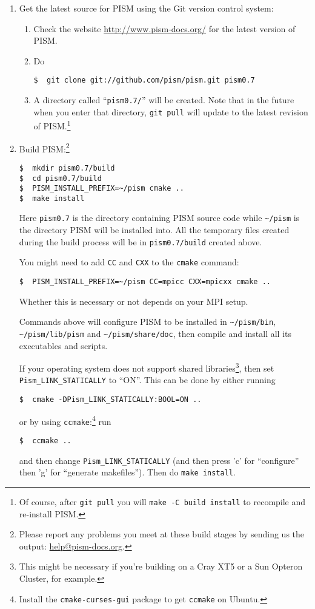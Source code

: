 \documentclass[titlepage,letterpaper,final]{scrartcl}
\begin{document}
\begin{enumerate}
\item Get the latest source for PISM using the Git version control system:
\begin{enumerate}
\item \label{getPISMstep} Check the website \url{http://www.pism-docs.org/} for the latest version of PISM.
\item Do
\begin{verbatim}
$  git clone git://github.com/pism/pism.git pism0.7
\end{verbatim}
\item A directory called ``\texttt{pism0.7/}'' will be created.  Note that in the future when you enter that directory,
  \texttt{git pull} will update to the latest revision of PISM.\footnote{Of course, after \texttt{git pull} you will \texttt{make -C build install} to recompile and re-install PISM.}
\end{enumerate}
\item Build PISM:\footnote{Please report any problems you meet at these build stages by sending us the output: \href{mailto:help@pism-docs.org}{help@pism-docs.org}.}
\begin{verbatim}
$  mkdir pism0.7/build
$  cd pism0.7/build
$  PISM_INSTALL_PREFIX=~/pism cmake ..
$  make install
\end{verbatim}
Here \texttt{pism0.7} is the directory containing PISM source code while \texttt{\textasciitilde/pism} is the directory PISM will be installed into. All the temporary files created during the build process will be in \texttt{pism0.7/build} created above.

You might need to add \texttt{CC} and \texttt{CXX} to the \texttt{cmake}
command:
\begin{verbatim}
$  PISM_INSTALL_PREFIX=~/pism CC=mpicc CXX=mpicxx cmake ..
\end{verbatim}
Whether this is necessary or not depends on your MPI setup.

Commands above will configure PISM to be installed in \texttt{\textasciitilde/pism/bin},
\texttt{\textasciitilde/pism/lib/pism} and
\texttt{\textasciitilde/pism/share/doc}, then compile and install all its
executables and scripts.

If your operating system does not support shared libraries\footnote{This might be necessary if you're building on a Cray XT5 or a Sun Opteron Cluster, for example.}, then set \texttt{Pism_LINK_STATICALLY} to ``ON''. This can be done by
either running
\begin{verbatim}
$  cmake -DPism_LINK_STATICALLY:BOOL=ON ..
\end{verbatim}
or by using \texttt{ccmake}:\footnote{Install the \texttt{cmake-curses-gui} package to get \texttt{ccmake} on Ubuntu.} run
\begin{verbatim}
$  ccmake ..
\end{verbatim}
and then change \texttt{Pism_LINK_STATICALLY} (and then press 'c' for ``configure'' then 'g' for ``generate makefiles'').  Then do \texttt{make install}.


\end{enumerate}
\end{document}

